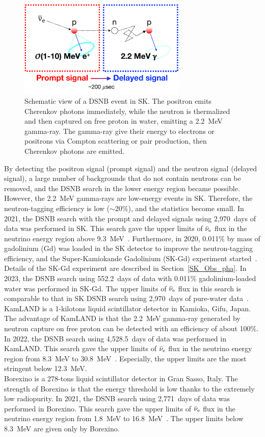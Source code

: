 \begin{figure}[h]
	\centering
	\includegraphics[width=8cm]{Figures/Introduction/DSNB_SK}
	\caption[Schematic view of a DSNB event in SK]{
	Schematic view of a DSNB event in SK.
	The positron emits Cherenkov photons immediately, while the neutron is thermalized and then captured on free proton in water, emitting a 2.2~MeV gamma-ray.
	The gamma-ray give their energy to electrons or positrons via Compton scattering or pair production, then Cherenkov photons are emitted.
	}\label{Introd_DSNB_SK}
\end{figure}

By detecting the positron signal (prompt signal) and the neutron signal (delayed signal), a large number of backgrounds that do not contain neutrons can be removed, and the DSNB search in the lower energy region became possible.
However, the 2.2~MeV gamma-rays are low-energy events in SK.
Therefore, the neutron-tagging efficiency is low ($\sim$20\%), and the statistics become small.
In 2021, the DSNB search with the prompt and delayed signals using 2,970~days of data was performed in SK.
This search gave the upper limits of $\bar{\nu}_{\rm e}$ flux in the neutrino energy region above 9.3~MeV~\cite{2021Abe}.
Furthermore, in 2020, 0.011\% by mass of gadolinium (Gd) was loaded in the SK detector to improve the neutron-tagging efficiency, and the Super-Kamiokande Gadolinium (SK-Gd) experiment started~\cite{2022Abe,2004Beacom}.
Details of the SK-Gd experiment are described in Section~\ref{SK_Obs_pha}.
In 2023, the DSNB search using 552.2~days of data with 0.011\% gadolinium-loaded water was performed in SK-Gd.
The upper limits of $\bar{\nu}_{\rm e}$ flux in this search is comparable to that in SK DSNB search using 2,970~days of pure-water data~\cite{2023Harada}.\\
\hs
KamLAND is a 1-kilotons liquid scintillator detector in Kamioka, Gifu, Japan.
The advantage of KamLAND is that the 2.2~MeV gamma-ray generated by neutron capture on free proton can be detected with an efficiency of about 100\%.
In 2022, the DSNB search using 4,528.5~days of data was performed in KamLAND.
This search gave the upper limits of $\bar{\nu}_{\rm e}$ flux in the neutrino energy region from 8.3~MeV to 30.8~MeV~\cite{2022AbeKamLAND}.
Especially, the upper limits are the most stringent below 12.3~MeV.\\
\hs
Borexino is a 278-tons liquid scintillator detector in Gran Sasso, Italy.
The strength of Borexino is that the energy threshold is low thanks to the extremely low radiopurity.
In 2021, the DSNB search using 2,771~days of data was performed in Borexino.
This search gave the upper limits of $\bar{\nu}_{\rm e}$ flux in the neutrino energy region from 1.8~MeV to 16.8~MeV~\cite{2021Agostini}.
The upper limits below 8.3~MeV are given only by Borexino.

